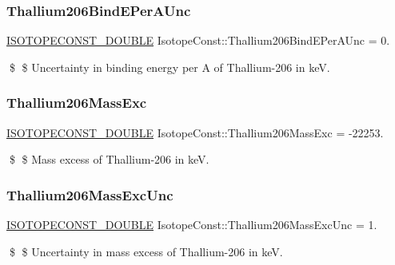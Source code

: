 \subsubsection{\texorpdfstring{Thallium206\+Bind\+E\+Per\+A\+Unc}{Thallium206BindEPerAUnc}}
{\footnotesize\ttfamily \mbox{\hyperlink{group___isotope_const-_macros_ga8f45a7272ce02c0b4c65c44636ed719a}{I\+S\+O\+T\+O\+P\+E\+C\+O\+N\+S\+T\+\_\+\+D\+O\+U\+B\+LE}} Isotope\+Const\+::\+Thallium206\+Bind\+E\+Per\+A\+Unc = 0.}

\$ \$ Uncertainty in binding energy per A of Thallium-\/206 in keV. \mbox{\label{group___isotope_const-_thallium-_tl206_ga719482337d9fbbb49acedacc32618d91}} 
\subsubsection{\texorpdfstring{Thallium206\+Mass\+Exc}{Thallium206MassExc}}
{\footnotesize\ttfamily \mbox{\hyperlink{group___isotope_const-_macros_ga8f45a7272ce02c0b4c65c44636ed719a}{I\+S\+O\+T\+O\+P\+E\+C\+O\+N\+S\+T\+\_\+\+D\+O\+U\+B\+LE}} Isotope\+Const\+::\+Thallium206\+Mass\+Exc = -\/22253.}

\$ \$ Mass excess of Thallium-\/206 in keV. \mbox{\label{group___isotope_const-_thallium-_tl206_ga3f40db04205cc9b123f5fbaac78ca8fc}} 
\subsubsection{\texorpdfstring{Thallium206\+Mass\+Exc\+Unc}{Thallium206MassExcUnc}}
{\footnotesize\ttfamily \mbox{\hyperlink{group___isotope_const-_macros_ga8f45a7272ce02c0b4c65c44636ed719a}{I\+S\+O\+T\+O\+P\+E\+C\+O\+N\+S\+T\+\_\+\+D\+O\+U\+B\+LE}} Isotope\+Const\+::\+Thallium206\+Mass\+Exc\+Unc = 1.}

\$ \$ Uncertainty in mass excess of Thallium-\/206 in keV. \mbox{\label{group___isotope_const-_thallium-_tl206_ga65ec322432a836fafb2561c0b87301b1}} 
